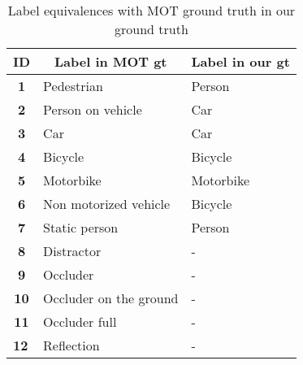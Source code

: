 \begin{table}[H]
\tiny
\begin{center}
\begin{tabular}{|c|l|l|}
\hline
\textbf{ID}                       & \multicolumn{1}{c|}{\textbf{Label in MOT gt}} & \multicolumn{1}{c|}{\textbf{Label in our gt}} \\ \hline
\textbf{1}                        & Pedestrian                                    & Person                                        \\ \hline
\textbf{2}                        & Person on vehicle                             & Car                                           \\ \hline
\textbf{3}                        & Car                                           & Car                                           \\ \hline
\textbf{4}                        & Bicycle                                       & Bicycle                                       \\ \hline
\textbf{5}                        & Motorbike                                     & Motorbike                                     \\ \hline
\textbf{6}                        & Non motorized vehicle                         & Bicycle                                       \\ \hline
\textbf{7}                        & Static person                                 & Person                                        \\ \hline
\textbf{8}                        & Distractor                                    & -                                             \\ \hline
\textbf{9}                        & Occluder                                      & -                                             \\ \hline
\textbf{10}                       & Occluder on the ground                        & -                                             \\ \hline
\textbf{11}                       & Occluder full                                 & -                                             \\ \hline
\multicolumn{1}{|l|}{\textbf{12}} & Reflection                                    & -                                             \\ \hline
\end{tabular}
\end{center}
\caption{Label equivalences with MOT ground truth in our ground truth}
\label{tab:mot_labels}
\end{table}
